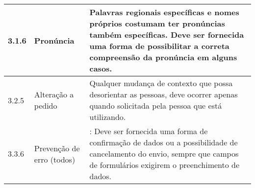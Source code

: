 \begin{appendices}
{\begin{minipage}{\linewidth}
{\begin{tabular}{|l|l|p{400px}|}
    3.1.6 &
      Pronúncia & Palavras regionais específicas e nomes próprios costumam ter pronúncias também específicas. Deve ser fornecida uma forma de possibilitar a correta compreensão da pronúncia em alguns casos. \\ \hline
    3.2.5 &
      Alteração a pedido & Qualquer mudança de contexto que possa desorientar as pessoas, deve ocorrer apenas quando solicitada pela pessoa que está utilizando. \\ \hline
    3.3.6 &
      Prevenção de erro (todos) & : Deve ser fornecida uma forma de confirmação de dados ou a possibilidade de cancelamento do envio, sempre que campos de formulários exigirem o preenchimento de dados. \\ \hline

\end{tabular}
}
\label{Diretrizes nível AAA}

\end{minipage}

}


\end{appendices}